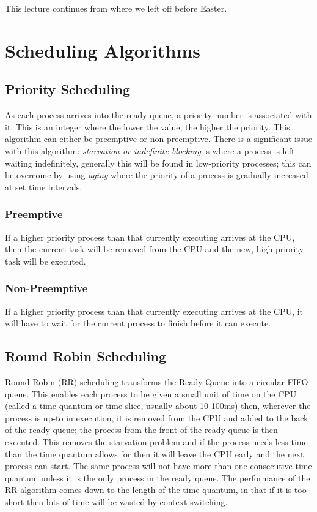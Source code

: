 
This lecture continues from where we left off before Easter.

\section{Scheduling Algorithms}

\subsection{Priority Scheduling}
As each process arrives into the ready queue, a priority number is associated with it. This is an integer where the lower the value, the higher the priority. This algorithm can either be preemptive or non-preemptive. There is a significant issue with this algorithm: \textit{starvation or indefinite blocking} is where a process is left waiting indefinitely, generally this will be found in low-priority processes; this can be overcome by using \textit{aging} where the priority of a process is gradually increased at set time intervals. 
\subsubsection{Preemptive}
If a higher priority process than that currently executing arrives at the CPU, then the current task will be removed from the CPU and the new, high priority task will be executed.
\subsubsection{Non-Preemptive}
If a higher priority process than that currently executing arrives at the CPU, it will have to wait for the current process to finish before it can execute.

\subsection{Round Robin Scheduling}
Round Robin (RR) scheduling transforms the Ready Queue into a circular FIFO queue. This enables each process to be given a small unit of time on the CPU (called a time quantum or time slice, usually about 10-100ms) then, wherever the process is up-to in execution, it is removed from the CPU and added to the back of the ready queue; the process from the front of the ready queue is then executed. This removes the starvation problem and if the process needs less time than the time quantum allows for then it will leave the CPU early and the next process can start. The same process will not have more than one consecutive time quantum unless it is the only process in the ready queue. The performance of the RR algorithm comes down to the length of the time quantum, in that if it is too short then lots of time will be wasted by context switching. 